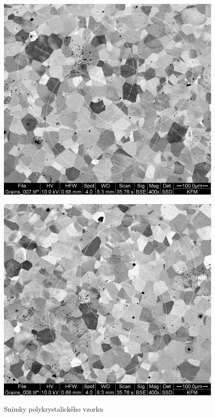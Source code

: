 \begin{figure}[!h]
    \vspace{0.5em} %

    \begin{minipage}[b]{0.48\linewidth}
        \centering
        \includegraphics[width=\linewidth]{A18 - SEM/Grains_007_circ.jpg}
        \label{fig:img3}
    \end{minipage}
    \hfill
    \begin{minipage}[b]{0.48\linewidth}
        \centering
        \includegraphics[width=\linewidth]{A18 - SEM/Grains_008_circ.jpg}
        \label{fig:img4}
    \end{minipage}

    \caption{Snímky polykrystalického vzorku }
    \label{fig:lom_rt_all}
\end{figure}

